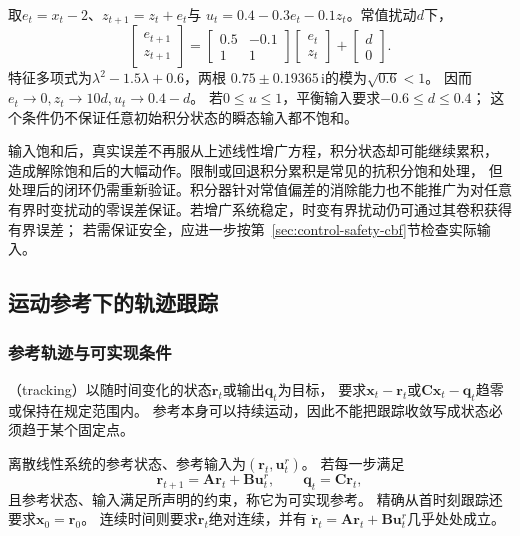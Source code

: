 \begin{example}[温度系统的积分增广]
\label{ex:control-temperature-integral}
取$e_t=x_t-2$、$z_{t+1}=z_t+e_t$与
$u_t=0.4-0.3e_t-0.1z_t$。常值扰动$d$下，
\[
  \begin{bmatrix}e_{t+1}\\z_{t+1}\end{bmatrix}
  =\begin{bmatrix}0.5&-0.1\\1&1\end{bmatrix}
   \begin{bmatrix}e_t\\z_t\end{bmatrix}
   +\begin{bmatrix}d\\0\end{bmatrix}.
\]
特征多项式为$\lambda^2-1.5\lambda+0.6$，两根
$0.75\pm0.19365\,\mathrm i$的模为$\sqrt{0.6}<1$。
因而$e_t\to0,z_t\to10d,u_t\to0.4-d$。
若$0\leq u\leq1$，平衡输入要求$-0.6\leq d\leq0.4$；
这个条件仍不保证任意初始积分状态的瞬态输入都不饱和。
\end{example}

输入饱和后，真实误差不再服从上述线性增广方程，积分状态却可能继续累积，
造成解除饱和后的大幅动作。限制或回退积分累积是常见的抗积分饱和处理，
但处理后的闭环仍需重新验证。积分器针对常值偏差的消除能力也不能推广为对任意
有界时变扰动的零误差保证。若增广系统稳定，时变有界扰动仍可通过其卷积获得有界误差；
若需保证安全，应进一步按第~\ref{sec:control-safety-cbf}节检查实际输入。

\subsection{运动参考下的轨迹跟踪}
\subsubsection{参考轨迹与可实现条件}
（tracking）以随时间变化的状态$\bm r_t$或输出$\bm q_t$为目标，
要求$\bm x_t-\bm r_t$或$\bm C\bm x_t-\bm q_t$趋零或保持在规定范围内。
参考本身可以持续运动，因此不能把跟踪收敛写成状态必须趋于某个固定点。
\begin{definition}[可实现参考]
\label{def:control-realizable-reference}
离散线性系统的参考状态、参考输入为$(\bm r_t,\bm u_t^r)$。
若每一步满足
\begin{equation}
  \bm r_{t+1}=\bm A\bm r_t+\bm B\bm u_t^r,
  \qquad \bm q_t=\bm C\bm r_t,
  \label{eq:control-realizable-reference}
\end{equation}
且参考状态、输入满足所声明的约束，称它为可实现参考。
精确从首时刻跟踪还要求$\bm x_0=\bm r_0$。
连续时间则要求$\bm r_t$绝对连续，并有
$\dot{\bm r}_t=\bm A\bm r_t+\bm B\bm u_t^r$几乎处处成立。
\end{definition}

